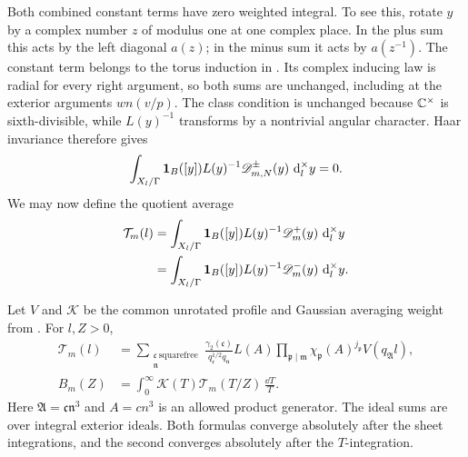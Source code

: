 Both combined constant terms have zero weighted integral.  To see this,
rotate \(y\) by a complex number \(z\) of modulus one at one complex place.
In the plus sum this
acts by the left diagonal \(a(z)\); in the minus sum it acts by \(a(z^{-1})\).
The constant term belongs to the torus induction in
.  Its complex inducing law is radial for every
right argument, so both sums are unchanged, including at the exterior
arguments \(wn(v/p)\).  The class condition is unchanged because
\(\mathbb{C}^\times\) is sixth-divisible, while \(L(y)^{-1}\) transforms by a
nontrivial angular character.  Haar invariance therefore gives
\begin{equation}\label{eq:reflection-angular-cancellation}
 \int_{X_l/\Gamma}\mathbf{1}_B([y])L(y)^{-1}
             \mathscr D_{m,N}^\pm(y)\,\,\mathrm{d}_l^\times y=0.
\end{equation}
We may now define the quotient average
\begin{equation}\label{eq:reflection-theta-average}
\begin{split}
 \mathcal T_m(l)
  &=\int_{X_l/\Gamma}\mathbf{1}_B([y])L(y)^{-1}
             \mathscr D_m^+(y)\,\,\mathrm{d}_l^\times y\\
  &=\int_{X_l/\Gamma}\mathbf{1}_B([y])L(y)^{-1}
             \mathscr D_m^-(y)\,\,\mathrm{d}_l^\times y.
\end{split}
\end{equation}

\begin{lemma}
\label{lem:reflection-theta-representation}
Let \(V\) and \(\mathcal K\) be the common unrotated profile and Gaussian
averaging weight from .  For \(l,Z>0\),
\begin{align}
 \mathcal T_m(l)
 &=\sum_{\substack{\mathfrak c\ \mathrm{squarefree}\\\mathfrak n}}
    \frac{\gamma_2(\mathfrak c)}{q_{\mathfrak c}^{1/2}q_{\mathfrak n}}
    L(A)\prod_{\mathfrak p\mid\mathfrak m}
                  \chi_{\mathfrak p}(A)^{j_{\mathfrak p}}
    V(q_{\mathfrak A}l),                                      \label{eq:reflection-unreflected}\\
 B_m(Z)
 &=\int_0^\infty\mathcal K(T)\mathcal T_m(T/Z)\,\frac{\dd T}{T}.
                                                               \label{eq:reflection-exact-average}
\end{align}
Here \(\mathfrak A=\mathfrak c\mathfrak n^3\) and \(A=cn^3\) is an
allowed product generator.  The ideal sums are over integral exterior
ideals.  Both formulas converge absolutely after the sheet integrations,
and the second converges absolutely after the \(T\)-integration.
\end{lemma}

